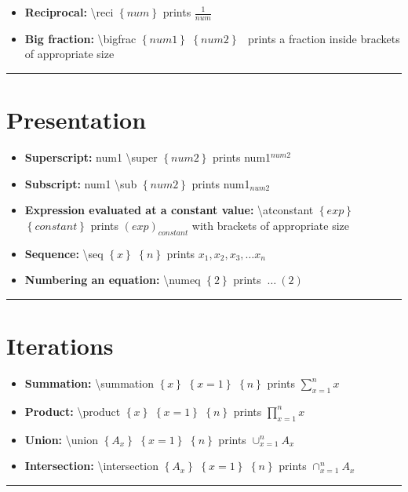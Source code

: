 \documentclass[12pt]{article}
\newcommand{\esc}{\textbackslash}
\newcommand{\braces}[1]{\ensuremath{\left\lbrace #1 \right\rbrace}}
\newcommand{\bigbrac}[1]{\ensuremath{\left( #1 \right)}}
\newcommand{\reci}[1]{\ensuremath{\displaystyle\frac{1}{#1}}}
\newcommand{\super}[1]{\ensuremath{^{#1}}}
\newcommand{\sub}[1]{\ensuremath{_{#1}}}
\newcommand{\atconstant}[2]{\ensuremath{\bigbrac{#1}_{#2}}}
\newcommand{\seq}[2]{\ensuremath{#1_1, #1_2, #1_3, \dots #1_{#2}}}
\newcommand{\numeq}[1]{\ensuremath{ \ \dots \ (#1)}}
\newcommand{\summation}[3]{\ensuremath{\sum\limits_{#2}^{#3} #1}}
\newcommand{\product}[3]{\ensuremath{\prod\limits_{#2}^{#3} #1}}
\newcommand{\union}[3]{\ensuremath{\cup_{#2}^{#3} #1}}
\newcommand{\intersection}[3]{\ensuremath{\cap_{#2}^{#3} #1}}
\newcommand{\drawline}{\vspace{5mm}\hrule}
\newcommand{\point}[1]{\item\textbf{#1:}}
\begin{document}
\begin{itemize}

\point{Reciprocal} \esc reci \braces{num} prints \reci{num}
\point{Big fraction} \esc bigfrac \braces{num1} \braces{num2} \ prints a fraction inside brackets of appropriate size

\end{itemize}
\drawline

\section{Presentation}

\begin{itemize}

\point{Superscript} num1 \esc super \braces{num2} prints num1\super{num2}
\point{Subscript} num1 \esc sub \braces{num2} prints num1\sub{num2}
\point{Expression evaluated at a constant value} \esc atconstant \braces{exp} \braces{constant} prints \atconstant{exp}{constant} with brackets of appropriate size
\point{Sequence} \esc seq \braces{x} \braces{n} prints \seq{x}{n}
\point{Numbering an equation} \esc numeq \braces{2} prints \numeq{2} 

\end{itemize}
\drawline

\section{Iterations}

\begin{itemize}

\point{Summation} \esc summation \braces{x} \braces{x=1} \braces{n} prints \summation{x}{x=1}{n}
\point{Product} \esc product \braces{x} \braces{x=1} \braces{n} prints \product{x}{x=1}{n}
\point{Union} \esc union \braces{A_x} \braces{x=1} \braces{n} prints \union{A_x}{x=1}{n}
\point{Intersection} \esc intersection \braces{A_x} \braces{x=1} \braces{n} prints \intersection{A_x}{x=1}{n}

\end{itemize}
\drawline
\end{document}
